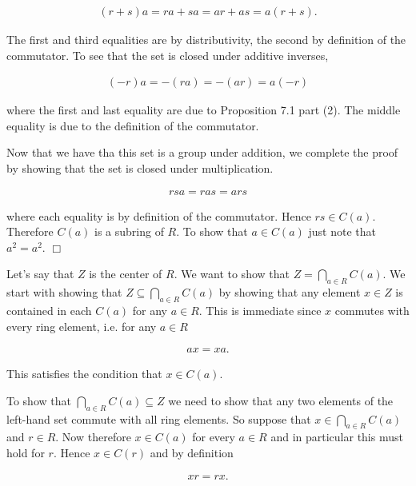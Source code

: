 \documentclass{article}
\begin{document}
  \begin{align*}
    (r+s)a = ra+sa = ar+as = a(r+s).
  \end{align*}

  The first and third equalities are by distributivity, the second by definition of the commutator.  To see that the set is closed under additive inverses,

  \begin{align*}
    (-r)a = -(ra) = -(ar) = a(-r)
  \end{align*}

  where the first and last equality are due to Proposition 7.1 part (2).  The middle equality is due to the definition of the commutator.

  Now that we have tha this set is a group under addition, we complete the proof by showing that the set is closed under multiplication.

  \begin{align*}
    rsa = ras = ars
  \end{align*}

  where each equality is by definition of the commutator.  Hence $rs\in C(a)$.  Therefore $C(a)$ is a subring of $R$.  To show that $a\in C(a)$ just note that $a^2 = a^2$.  $\Box$

  \vspace{1cm}

  Let's say that $Z$ is the center of $R$.  We want to show that $\displaystyle Z = \bigcap_{a\in R} C(a)$.  We start with showing that $Z \subseteq \displaystyle \bigcap_{a\in R} C(a)$ by showing that any element $x\in Z$ is contained in each $C(a)$ for any $a\in R$.  This is immediate since $x$ commutes with every ring element, i.e. for any $a\in R$

  \begin{align*}
    ax = xa.
  \end{align*}

  This satisfies the condition that $x\in C(a)$.

  To show that $\displaystyle \bigcap_{a\in R} C(a) \subseteq Z$ we need to show that any two elements of the left-hand set commute with all ring elements.  So suppose that $x\in \displaystyle \bigcap_{a\in R}C(a)$ and $r\in R$.  Now therefore $x\in C(a)$ for every $a\in R$ and in particular this must hold for $r$.  Hence $x\in C(r)$ and by definition

  \begin{align*}
    xr = rx.
  \end{align*}
\end{document}
